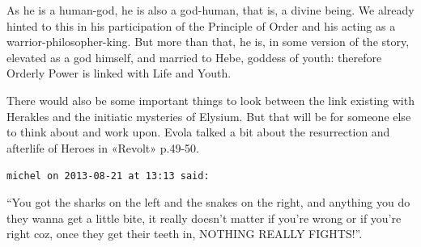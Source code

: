 \begin{footnotesize}
\begin{sffamily}
As he is a human-god, he is also a god-human, that is, a divine being. We already hinted to this in his participation of the Principle of Order and his acting as a warrior-philosopher-king. But more than that, he is, in some version of the story, elevated as a god himself, and married to Hebe, goddess of youth: therefore Orderly Power is linked with Life and Youth.

There would also be some important things to look between the link existing with Herakles and the initiatic mysteries of Elysium. But that will be for someone else to think about and work upon. Evola talked a bit about the resurrection and afterlife of Heroes in «Revolt» p.49-50.

\hfill

\texttt{michel on 2013-08-21 at 13:13 said:}

``You got the sharks on the left and the snakes on the right, and anything you do they wanna get a little bite, it really doesn't matter if you're wrong or if you're right coz, once they get their teeth in, NOTHING REALLY FIGHTS!''.


\hfill

\end{sffamily}
\end{footnotesize}

